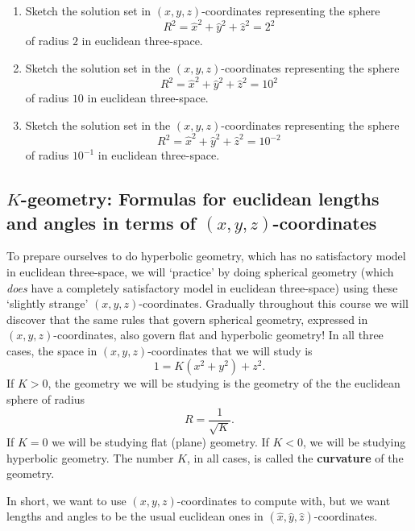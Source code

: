 \documentclass{ximera}
\begin{document}
\begin{problem}\hfil
\begin{enumerate}
\item Sketch the solution set in $\left(  x,y,z\right)  $-coordinates
representing the sphere%
\[
R^{2}=\hat{x}^{2}+\hat{y}^{2}+\hat{z}^{2}=2^{2}%
\]
of radius $2$ in euclidean three-space.

\item Sketch the solution set in the $\left(  x,y,z\right)  $-coordinates
representing the sphere%
\[
R^{2}=\hat{x}^{2}+\hat{y}^{2}+\hat{z}^{2}=10^{2}%
\]
of radius $10$ in euclidean three-space.

\item Sketch the solution set in the $\left(  x,y,z\right)  $-coordinates
representing the sphere%
\[
R^{2}=\hat{x}^{2}+\hat{y}^{2}+\hat{z}^{2}=10^{-2}%
\]
of radius $10^{-1}$ in euclidean three-space.
\end{enumerate}
\end{problem}

\subsection*{$K$-geometry: Formulas for euclidean lengths and angles in terms
of $\left(  x,y,z\right)  $-coordinates}

To prepare ourselves to do hyperbolic geometry, which has no satisfactory
model in euclidean three-space, we will `practice' by doing spherical geometry
(which \textit{does} have a completely satisfactory model in euclidean
three-space) using these `slightly strange' $\left(  x,y,z\right)
$-coordinates. Gradually throughout this course we will discover that the same
rules that govern spherical geometry, expressed in $\left(  x,y,z\right)
$-coordinates, also govern flat and hyperbolic geometry! In all three cases,
the space in $\left(  x,y,z\right)  $-coordinates that we will study is%
\begin{equation}
1=K\left(  x^{2}+y^{2}\right)  +z^{2}. \label{11}%
\end{equation}
If $K>0$, the geometry we will be studying is the geometry of the the
euclidean sphere of radius%
\[
R=\frac{1}{\sqrt{K}}.
\]
If $K=0$ we will be studying flat (plane) geometry. If $K<0$, we will be
studying hyperbolic geometry. The number $K$, in all cases, is called the
\textbf{curvature} of the geometry.

In short, we want to use $\left(  x,y,z\right)  $-coordinates to compute with,
but we want lengths and angles to be the usual euclidean ones in $\left(
\hat{x},\hat{y},\hat{z}\right)  $-coordinates.
\end{document}
